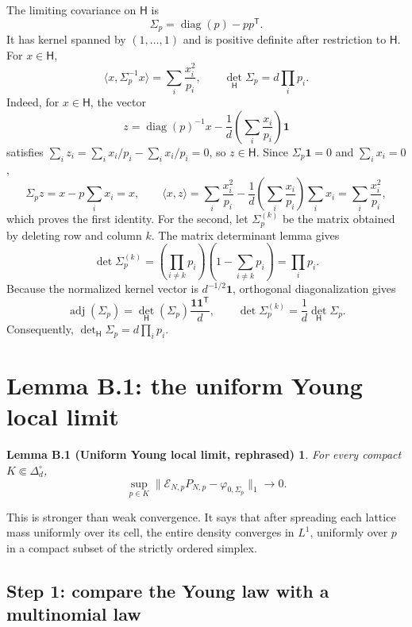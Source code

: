 \documentclass[11pt]{article}
\newcommand{\diag}{\operatorname{diag}}
\newcommand{\htile}{\mathsf H}
\newtheorem*{lemmaBone}{Lemma B.1 (Uniform Young local limit, rephrased)}
\begin{document}
The limiting covariance on $\htile$ is
\[
  \Sigma_p=\diag(p)-pp^{\mathsf T}.
\]
It has kernel spanned by $(1,\ldots,1)$ and is positive definite after
restriction to $\htile$.  For $x\in\htile$,
\begin{equation}\label{eq:quadratic-form}
  \langle x,\Sigma_p^{-1}x\rangle=\sum_i\frac{x_i^2}{p_i},
  \qquad
  \det_{\htile}\Sigma_p=d\prod_i p_i.
\end{equation}
Indeed, for $x\in\htile$, the vector
\[
  z=\diag(p)^{-1}x
    -\frac1d\left(\sum_i\frac{x_i}{p_i}\right)\mathbf 1
\]
satisfies $\sum_i z_i=\sum_i x_i/p_i-\sum_i x_i/p_i=0$, so
$z\in\htile$.  Since $\Sigma_p\mathbf 1=0$ and $\sum_i x_i=0$,
\[
  \Sigma_p z=x-p\sum_i x_i=x,
  \qquad
  \langle x,z\rangle
  =\sum_i\frac{x_i^2}{p_i}
   -\frac1d\left(\sum_i\frac{x_i}{p_i}\right)\sum_i x_i
  =\sum_i\frac{x_i^2}{p_i},
\]
which proves the first identity.  For the second, let
$\Sigma_p^{(k)}$ be the matrix obtained by deleting row and column $k$.
The matrix determinant lemma gives
\[
  \det\Sigma_p^{(k)}
  =\left(\prod_{i\ne k}p_i\right)
    \left(1-\sum_{i\ne k}p_i\right)
  =\prod_i p_i.
\]
Because the normalized kernel vector is $d^{-1/2}\mathbf 1$, orthogonal
diagonalization gives
\[
  \operatorname{adj}(\Sigma_p)
  =\det_{\htile}(\Sigma_p)
    \frac{\mathbf 1\mathbf 1^{\mathsf T}}d,
  \qquad
  \det\Sigma_p^{(k)}
  =\frac1d\det_{\htile}\Sigma_p.
\]
Consequently, $\det_{\htile}\Sigma_p=d\prod_i p_i$.

\section{Lemma B.1: the uniform Young local limit}

\begin{lemmaBone}
For every compact $K\Subset\Delta_d^\circ$,
\begin{equation}\label{eq:young-local-limit-note}
  \sup_{p\in K}
  \|\mathcal E_{N,p}P_{N,p}-\varphi_{0,\Sigma_p}\|_1
  \longrightarrow0.
\end{equation}
\end{lemmaBone}

This is stronger than weak convergence.  It says that after spreading each
lattice mass uniformly over its cell, the entire density converges in
$L^1$, uniformly over $p$ in a compact subset of the strictly ordered
simplex.

\subsection*{Step 1: compare the Young law with a multinomial law}
\end{document}
